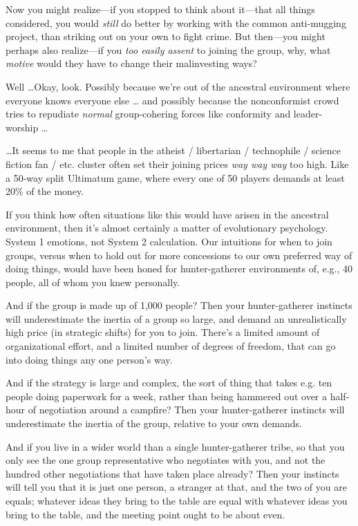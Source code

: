 {
 Now you might realize---if you stopped to think about it---that
all things considered, you would \textit{still} do better by working
with the common anti-mugging project, than striking out on your own to
fight crime. But then---you might perhaps also realize---if you
\textit{too easily assent} to joining the group, why, what
\textit{motive} would they have to change their malinvesting ways?}

{
 Well \ldots Okay, look. Possibly because we're out
of the ancestral environment where everyone knows everyone else \ldots
and possibly because the nonconformist crowd tries to repudiate
\textit{normal} group-cohering forces like conformity and
leader-worship \ldots}

{
 \ldots It seems to me that people in the atheist / libertarian /
technophile / science fiction fan / etc. cluster often set their
joining prices \textit{way way way} too high. Like a 50-way split
Ultimatum game, where every one of 50 players demands at least 20\% of
the money.}

{
 If you think how often situations like this would have arisen in
the ancestral environment, then it's almost certainly a
matter of evolutionary psychology. System 1 emotions, not System 2
calculation. Our intuitions for when to join groups, versus when to
hold out for more concessions to our own preferred way of doing things,
would have been honed for hunter-gatherer environments of, e.g., 40
people, all of whom you knew personally.}

{
 And if the group is made up of 1,000 people? Then your
hunter-gatherer instincts will underestimate the inertia of a group so
large, and demand an unrealistically high price (in strategic shifts)
for you to join. There's a limited amount of
organizational effort, and a limited number of degrees of freedom, that
can go into doing things any one person's way.}

{
 And if the strategy is large and complex, the sort of thing that
takes e.g. ten people doing paperwork for a week, rather than being
hammered out over a half-hour of negotiation around a campfire? Then
your hunter-gatherer instincts will underestimate the inertia of the
group, relative to your own demands.}

{
 And if you live in a wider world than a single hunter-gatherer
tribe, so that you only see the one group representative who negotiates
with you, and not the hundred other negotiations that have taken place
already? Then your instincts will tell you that it is just one person,
a stranger at that, and the two of you are equals; whatever ideas they
bring to the table are equal with whatever ideas you bring to the
table, and the meeting point ought to be about even.}

